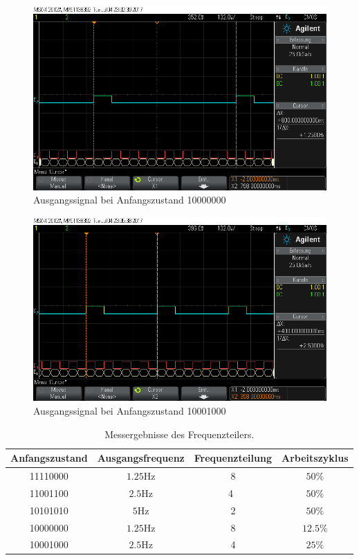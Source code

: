 \documentclass[10pt]{scrreprt}
\begin{document}
    \begin{figure}[H]
        \includegraphics[width=\textwidth]{scope_10.png}
        \caption{Ausgangssignal bei Anfangszustand 10000000}
    \end{figure}
    \begin{figure}[H]
        \includegraphics[width=\textwidth]{scope_14.png}
        \caption{Ausgangssignal bei Anfangszustand 10001000}
    \end{figure}
    \begin{table}[H]
        \centering
        \begin{tabular}{cccc}
            \toprule
            Anfangszustand & Ausgangsfrequenz & Frequenzteilung & Arbeitszyklus\\
            \midrule
            11110000 & $1.25\si{\hertz}$ & 8 & $50\%$\\
            11001100 & $2.5\si{\hertz}$ & 4\ & $50\%$\\
            10101010 & $5\si{\hertz}$ & 2 & $50\%$\\
            10000000 & $1.25\si{\hertz}$ & 8 & $12.5\%$\\
            10001000 & $2.5\si{\hertz}$ & 4 & $25\%$\\
            \bottomrule
        \end{tabular}
        \caption{Messergebnisse des Frequenzteilers.}
        \label{tab:freqteiler}
    \end{table}
\end{document}
